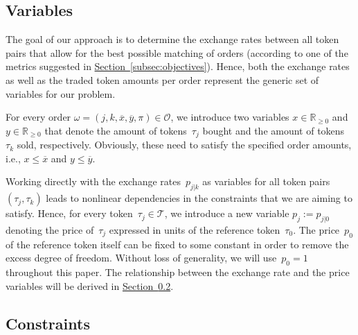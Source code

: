 \documentclass[11pt,parskip=full]{scrartcl}%
\newcommand*{\ie}{i.e., }
\newcommand*{\tokens}{\mathcal{T}}          %
\newcommand*{\orders}{\mathcal{O}}          %
\newcommand*{\secref}[1]{\hyperref[{#1}]{Section~\ref*{#1}}}
\begin{document}
\subsection{Variables}
\label{subsec:variables}

The goal of our approach is to determine the exchange rates between all token pairs that allow for the best possible matching of orders (according to one of the metrics suggested in \secref{subsec:objectives}).
Hence, both the exchange rates as well as the traded token amounts per order represent the generic set of variables for our problem.

For every order $\omega = (j,k,\overline{x},\overline{y},\pi) \in \orders$, we introduce two variables $x \in \mathbb{R}_{\ge 0}$ and $y \in \mathbb{R}_{\ge 0}$ that denote the amount of tokens~$\tau_j$ bought and the amount of tokens~$\tau_k$ sold, respectively.
Obviously, these need to satisfy the specified order amounts, \ie $x \le \overline{x}$ and $y \le \overline{y}$.

Working directly with the exchange rates~$p_{j|k}$ as variables for all token pairs $(\tau_j,\tau_k)$ leads to nonlinear dependencies in the constraints that we are aiming to satisfy.
Hence, for every token~$\tau_j \in \tokens$, we introduce a new variable $p_j := p_{j|0}$ denoting the price of~$\tau_j$ expressed in units of the reference token~$\tau_0$.
The price~$p_0$ of the reference token itself can be fixed to some constant in order to remove the excess degree of freedom.
Without loss of generality, we will use~$p_0 = 1$ throughout this paper.
The relationship between the exchange rate and the price variables will be derived in \secref{subsec:constraints}.


\subsection{Constraints}
\label{subsec:constraints}
\end{document}
